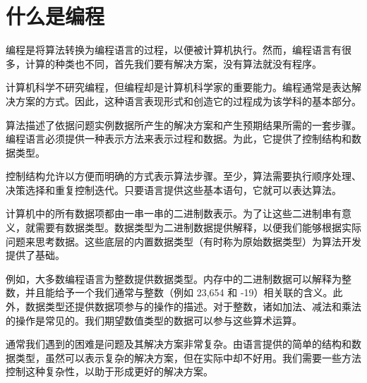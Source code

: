 \section{什么是编程}

编程是将算法转换为编程语言的过程，以便被计算机执行。然而，编程语言有很多，计算的种类也不同，首先我们要有解决方案，没有算法就没有程序。


计算机科学不研究编程，但编程却是计算机科学家的重要能力。编程通常是表达解决方案的方式。因此，这种语言表现形式和创造它的过程成为该学科的基本部分。


算法描述了依据问题实例数据所产生的解决方案和产生预期结果所需的一套步骤。编程语言必须提供一种表示方法来表示过程和数据。为此，它提供了控制结构和数据类型。


控制结构允许以方便而明确的方式表示算法步骤。至少，算法需要执行顺序处理、决策选择和重复控制迭代。只要语言提供这些基本语句，它就可以表达算法。


计算机中的所有数据项都由一串一串的二进制数表示。为了让这些二进制串有意义，就需要有数据类型。数据类型为二进制数据提供解释，以便我们能够根据实际问题来思考数据。这些底层的内置数据类型（有时称为原始数据类型）为算法开发提供了基础。


例如，大多数编程语言为整数提供数据类型。内存中的二进制数据可以解释为整数，并且能给予一个我们通常与整数（例如 23,654 和 -19）相关联的含义。此外，数据类型还提供数据项参与的操作的描述。对于整数，诸如加法、减法和乘法的操作是常见的。我们期望数值类型的数据可以参与这些算术运算。


通常我们遇到的困难是问题及其解决方案非常复杂。由语言提供的简单的结构和数据类型，虽然可以表示复杂的解决方案，但在实际中却不好用。我们需要一些方法控制这种复杂性，以助于形成更好的解决方案。